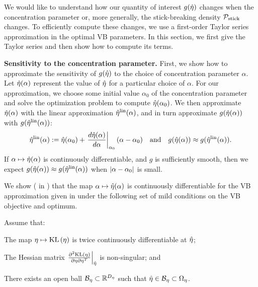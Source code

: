 We would like to understand how our quantity of interest $g(\hat\eta)$ changes
when the concentration parameter or, more generally, the stick-breaking density
$\mathcal{P}_{\mathrm{stick}}$ changes. To efficiently compute these changes, we use a first-order
Taylor series approximation in the optimal VB parameters. In this section, we
first give the Taylor series and then show how to compute its terms.

\noindent \textbf{Sensitivity to the concentration parameter.} First, we show
how to approximate the sensitivity of $g(\hat\eta)$ to the choice of
concentration parameter $\alpha$. Let $\hat\eta(\alpha)$ represent the value of
$\hat\eta$ for a particular choice of $\alpha$. For our approximation, we choose
some initial value $\alpha_0$ of the concentration parameter and solve the
optimization problem to compute $\hat\eta(\alpha_0)$. We then approximate
$\hat\eta(\alpha)$ with the linear approximation $\hat\eta^{\mathrm{lin}}(\alpha)$, and in turn
approximate $g(\hat\eta(\alpha))$ with $g(\hat\eta^{\mathrm{lin}}(\alpha))$:
%
\begin{align*}
%
\etalin(\alpha) :=
    \etaopt(\alpha_0) +
    \fracat{d\etaopt(\alpha)}{d\alpha}{\alpha_0} (\alpha - \alpha_0)
\mathand
g(\etaopt(\alpha)) \approx g(\etalin(\alpha)).
%
\end{align*}
%
If $\alpha \mapsto \hat\eta(\alpha)$ is continuously differentiable, and $g$ is
sufficiently smooth, then we expect $g(\hat\eta(\alpha)) \approx
g(\hat\eta^{\mathrm{lin}}(\alpha))$ when $\left|\alpha - \alpha_0\right|$ is small.

We show ( in ) that the map
$\alpha \mapsto \hat\eta(\alpha)$ is continuously differentiable for the VB
approximation given in  under the following set of mild
conditions on the VB objective and optimum.


\begin{assu}
%
Assume that:
%
\begin{enumerate*}[label=(\arabic*)]
%
    \item {} The map $\eta \mapsto \mathrm{KL}\left(\eta\right)$ is twice
    continuously differentiable at $\hat\eta$;

    \item{} The Hessian matrix $\left.\frac{\partial^2 \mathrm{KL}\left(\eta\right)}{\partial \eta \partial \eta^T}\right\vert_{\hat\eta}$ is non-singular; and

    \item {} There exists an open ball $\mathcal{B}_\eta
    \subset \mathbb{R}^{D_{\eta}}$ such that $\hat\eta \in \mathcal{B}_\eta \subset
    \Omega_{\eta}$.
%
\end{enumerate*}
%
\end{assu}


